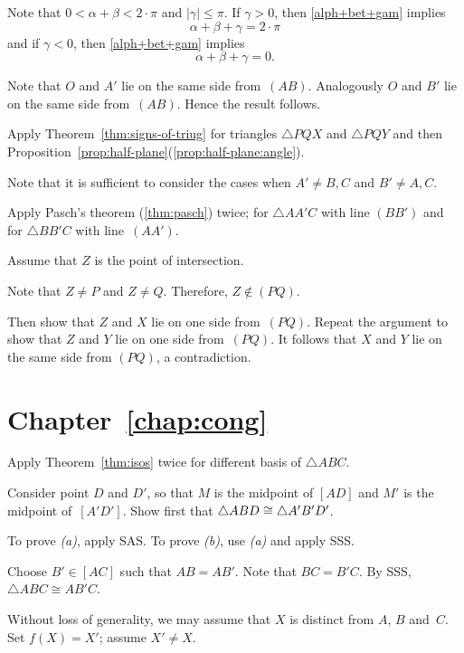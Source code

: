 Note that $0<\alpha+\beta<2\cdot\pi$ and $|\gamma|\le \pi$.
If $\gamma> 0$, then \ref{alph+bet+gam} implies
$$\alpha+\beta+\gamma=2\cdot\pi$$
and 
if $\gamma<0$, then \ref{alph+bet+gam} implies
$$\alpha+\beta+\gamma=0.$$


Note that $O$ and $A'$
lie on the same side from~$(AB)$.
Analogously $O$ and $B'$
lie on the same side from~$(AB)$.
Hence the result follows.


Apply Theorem~\ref{thm:signs-of-triug} for triangles $\triangle PQX$ and $\triangle PQY$ and then 
Proposition~\ref{prop:half-plane}(\ref{prop:half-plane:angle}).

Note that it is sufficient to consider the cases when $A'\ne B,C$ and $B'\ne A, C$.

Apply Pasch's theorem (\ref{thm:pasch}) twice;
for $\triangle AA'C$ with line $(BB')$
and for $\triangle BB'C$ with line~$(AA')$.

Assume that $Z$ is the point of intersection.

Note that $Z\ne P$ and $Z\ne Q$.
Therefore, $Z\notin (PQ)$.

Then show that $Z$ and $X$ lie on one side from~$(PQ)$.
Repeat the argument to show that $Z$ and $Y$ lie on one side from~$(PQ)$.
It follows that $X$ and $Y$ lie on the same side from $(PQ)$, a contradiction.


\section*{Chapter~\ref{chap:cong}}
\setcounter{eqtn}{0}

Apply Theorem~\ref{thm:isos} twice for different basis of $\triangle ABC$.

Consider point $D$ and $D'$, so that 
$M$ is the midpoint of $[AD]$
and 
$M'$ is the midpoint of~$[A'D']$.
Show first that $\triangle ABD\z\cong \triangle A'B'D'$.

 To prove \textit{(a)}, apply SAS.
To prove \textit{(b)}, use \textit{(a)} and apply SSS.

Choose $B'\in [AC]$ such that $AB=AB'$.
Note that $BC=B'C$.
By SSS, 
 $\triangle ABC\cong AB'C$.

Without loss of generality, we may assume that $X$ is distinct from $A$, $B$ and~$C$.
Set $f(X)=X'$; assume $X'\ne X$.

